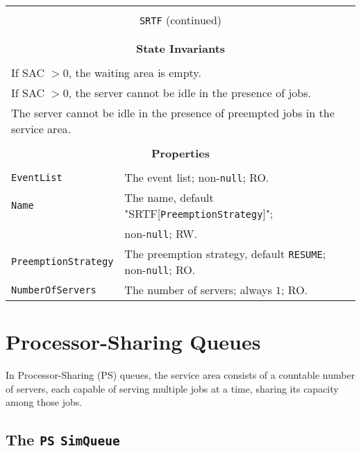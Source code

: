 \documentclass[12pt]{book}
\begin{document}
\begin{tabular}{|l|l|l|}
\hline
\multicolumn{3}{|c|}{} \\
\multicolumn{3}{|c|}{\lstinline[basicstyle=\large]{SRTF} (continued)} \\
\multicolumn{3}{|c|}{} \\
\hline
\multicolumn{3}{|c|}{} \\
\multicolumn{3}{|c|}{\bf State  Invariants} \\
\multicolumn{3}{|c|}{} \\
\hline
\multicolumn{3}{|l|}{If SAC $> 0$, the waiting area is empty.} \\
\multicolumn{3}{|l|}{If SAC $> 0$, the server cannot be idle in the presence of jobs.} \\
\multicolumn{3}{|l|}{The server cannot be idle in the presence of preempted jobs in the service area.} \\
\hline
\multicolumn{3}{|c|}{} \\
\multicolumn{3}{|c|}{\bf Properties} \\
\multicolumn{3}{|c|}{} \\
\hline
\lstinline|EventList|          & \multicolumn{2}{|l|}{The event list; non-\lstinline|null|; RO.} \\
\hline
\lstinline|Name|               & \multicolumn{2}{|l|}{The name, default "SRTF[\lstinline|PreemptionStrategy|]";} \\
                               & \multicolumn{2}{|l|}{non-\lstinline|null|; RW.} \\
\hline
\lstinline|PreemptionStrategy| & \multicolumn{2}{|l|}{The preemption strategy, default \lstinline|RESUME|;
                                                      non-\lstinline|null|; RO.} \\
\hline
\lstinline|NumberOfServers|    & \multicolumn{2}{|l|}{The number of servers; always $1$; RO.} \\
\hline
\end{tabular}

\section{Processor-Sharing Queues}

In Processor-Sharing (PS) queues,
  the service area consists of a countable number of servers,
  each capable of serving multiple jobs at a time,
  sharing its capacity among those jobs.
  
\subsection{The \lstinline{PS} \lstinline{SimQueue}}
\end{document}
